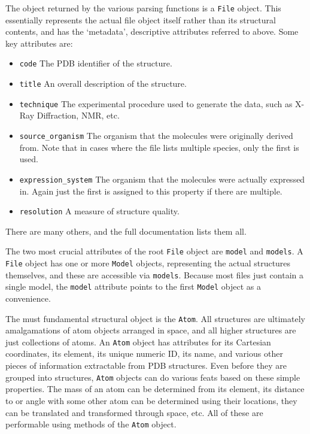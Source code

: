 The object returned by the various parsing functions is a \texttt{File} object. This essentially represents the actual file object itself rather than its structural contents, and has the `metadata', descriptive attributes referred to above. Some key attributes are:

\begin{itemize}
  \item \texttt{code} The PDB identifier of the structure.
  \item \texttt{title} An overall description of the structure.
  \item \texttt{technique} The experimental procedure used to generate the data, such as X-Ray Diffraction, NMR, etc.
  \item \texttt{source\_organism} The organism that the molecules were originally derived from. Note that in cases where the file lists multiple species, only the first is used.
  \item \texttt{expression\_system} The organism that the molecules were actually expressed in. Again just the first is assigned to this property if there are multiple.
  \item \texttt{resolution} A measure of structure quality.
\end{itemize}

There are many others, and the full documentation lists them all.

The two most crucial attributes of the root \texttt{File} object are \texttt{model} and \texttt{models}. A \texttt{File} object has one or more \texttt{Model} objects, representing the actual structures themselves, and these are accessible via \texttt{models}. Because most files just contain a single model, the \texttt{model} attribute points to the first \texttt{Model} object as a convenience.

The must fundamental structural object is the \texttt{Atom}. All structures are ultimately amalgamations of atom objects arranged in space, and all higher structures are just collections of atoms. An \texttt{Atom} object has attributes for its Cartesian coordinates, its element, its unique numeric ID, its name, and various other pieces of information extractable from PDB structures. Even before they are grouped into structures, \texttt{Atom} objects can do various feats based on these simple properties. The mass of an atom can be determined from its element, its distance to or angle with some other atom can be determined using their locations, they can be translated and transformed through space, etc. All of these are performable using methods of the \texttt{Atom} object.

